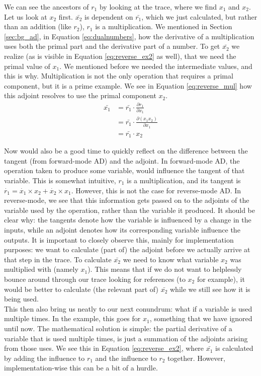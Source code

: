     We can see the ancestors of $r_1$ by looking at the trace, where we find $x_1$ and $x_2$.
    Let us look at $x_2$ first.
    $\bar{x_2}$ is dependent on $\bar{r_1}$, which we just calculated, but rather than an addition (like $r_2$), $r_1$ is a multiplication.
    We mentioned in Section \ref{sec:bg_ad}, in Equation \ref{eq:dualnumbers}, how the derivative of a multiplication uses both the primal part and the derivative part of a number.
    To get $\bar{x_2}$ we realize (as is visible in Equation \ref{eq:reverse_ex2} as well), that we need the primal value of $x_1$.
    We mentioned before we needed the intermediate values, and this is why.
    Multiplication is not the only operation that requires a primal component, but it is a prime example.
    We see in Equation \ref{eq:reverse_mul} how this adjoint resolves to use the primal component $x_2$.
    \begin{equation} \label{eq:reverse_mul}
        \begin{aligned}
            \bar{x_1}&=\bar{r_1}\cdot\frac{\partial r_1}{\partial x_1}\\
            &=\bar{r_1}\cdot\frac{\partial(x_1x_2)}{\partial x_1}\\
            &=\bar{r_1}\cdot x_2
        \end{aligned}
    \end{equation}

    Now would also be a good time to quickly reflect on the difference between the tangent (from forward-mode AD) and the adjoint.
    In forward-mode AD, the operation taken to produce some variable, would influence the tangent of that variable.
    This is somewhat intuitive, $r_1$ is a multiplication, and its tangent is $\dot{r_1}=\dot{x_1}\times x_2+\dot{x_2}\times x_1$.
    However, this is not the case for reverse-mode AD.
    In reverse-mode, we see that this information gets passed on to the adjoints of the variable used by the operation, rather than the variable it produced.
    It should be clear why: the tangents denote how the variable is influenced by a change in the inputs, while an adjoint denotes how its corresponding variable influence the outputs.
    It is important to closely observe this, mainly for implementation purposes: we want to calculate (part of) the adjoint before we actually arrive at that step in the trace.
    To calculate $\bar{x_2}$ we need to know what variable $x_2$ was multiplied with (namely $x_1$).
    This means that if we do not want to helplessly bounce around through our trace looking for references (to $x_2$ for example), it would be better to calculate (the relevant part of) $\bar{x_2}$ while we still see how it is being used.\\
    This then also bring us neatly to our next conundrum: what if a variable is used multiple times.
    In the example, this goes for $x_1$, something that we have ignored until now.
    The mathematical solution is simple: the partial derivative of a variable that is used multiple times, is just a summation of the adjoints arising from those uses.
    We see this in Equation \ref{eq:reverse_ex2}, where $\bar{x_1}$ is calculated by adding the influence to $r_1$ and the influence to $r_2$ together.
    However, implementation-wise this can be a bit of a hurdle.

